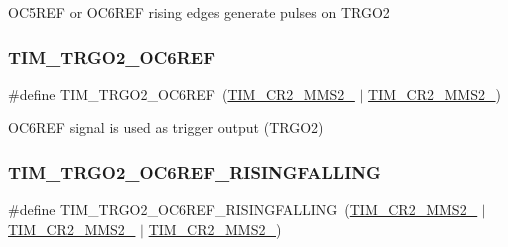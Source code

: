 O\+C5\+R\+EF or O\+C6\+R\+EF rising edges generate pulses on T\+R\+G\+O2 \mbox{\label{group___t_i_m___master___mode___selection__2_gae88c0c9c55ffb739dada0bdea37a809d}} 
\subsubsection{\texorpdfstring{TIM\_TRGO2\_OC6REF}{TIM\_TRGO2\_OC6REF}}
{\footnotesize\ttfamily \#define T\+I\+M\+\_\+\+T\+R\+G\+O2\+\_\+\+O\+C6\+R\+EF~(\mbox{\hyperlink{group___peripheral___registers___bits___definition_ga3503937610adbf78153c1fcfa4bcd6ea}{T\+I\+M\+\_\+\+C\+R2\+\_\+\+M\+M\+S2\+\_}} $\vert$ \mbox{\hyperlink{group___peripheral___registers___bits___definition_ga07efe60d8d7305b78085233ddaecb990}{T\+I\+M\+\_\+\+C\+R2\+\_\+\+M\+M\+S2\+\_}})}

O\+C6\+R\+EF signal is used as trigger output (T\+R\+G\+O2) \mbox{\label{group___t_i_m___master___mode___selection__2_gaefa63d8189e6e6fcd592fcf4af8aa416}} 
\subsubsection{\texorpdfstring{TIM\_TRGO2\_OC6REF\_RISINGFALLING}{TIM\_TRGO2\_OC6REF\_RISINGFALLING}}
{\footnotesize\ttfamily \#define T\+I\+M\+\_\+\+T\+R\+G\+O2\+\_\+\+O\+C6\+R\+E\+F\+\_\+\+R\+I\+S\+I\+N\+G\+F\+A\+L\+L\+I\+NG~(\mbox{\hyperlink{group___peripheral___registers___bits___definition_ga3503937610adbf78153c1fcfa4bcd6ea}{T\+I\+M\+\_\+\+C\+R2\+\_\+\+M\+M\+S2\+\_}} $\vert$ \mbox{\hyperlink{group___peripheral___registers___bits___definition_ga0248e35956d0d22ac66dcd67aab317c5}{T\+I\+M\+\_\+\+C\+R2\+\_\+\+M\+M\+S2\+\_}} $\vert$ \mbox{\hyperlink{group___peripheral___registers___bits___definition_ga07efe60d8d7305b78085233ddaecb990}{T\+I\+M\+\_\+\+C\+R2\+\_\+\+M\+M\+S2\+\_}})}

